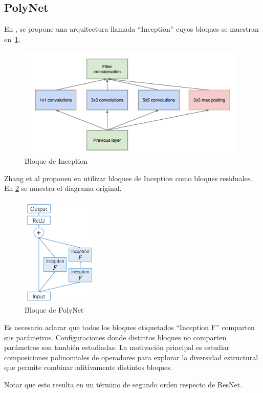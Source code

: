 \documentclass[titlepage,a4paper,oneside]{article}
\begin{document}
\subsection{PolyNet}
En \cite{szegedy2014going}, se propone una arquitectura llamada ``Inception'' cuyos bloques se muestran en~\ref{inception_block}.

\begin{figure}[H]
\centering
\includegraphics[height=200px]{images/inception_block.png}
\caption{Bloque de Inception}
\label{inception_block}
\end{figure}

Zhang et al proponen en \cite{zhang2017polynet} utilizar bloques de Inception como bloques residuales. En \ref{polynet_block} se muestra el diagrama original.

\begin{figure}[H]
\centering
\includegraphics[height=200px]{images/polynet.png}
\caption{Bloque de PolyNet}
\label{polynet_block}
\end{figure}

Es necesario aclarar que todos los bloques etiquetados ``Inception F'' comparten sus parámetros. Configuraciones donde distintos bloques no comparten parámetros son también estudiadas. La motivación principal es estudiar composiciones polinomiales de operadores para explorar la diversidad estructural que permite combinar aditivamente distintos bloques.

Notar que esto resulta en un término de segundo orden respecto de ResNet.
\end{document}
